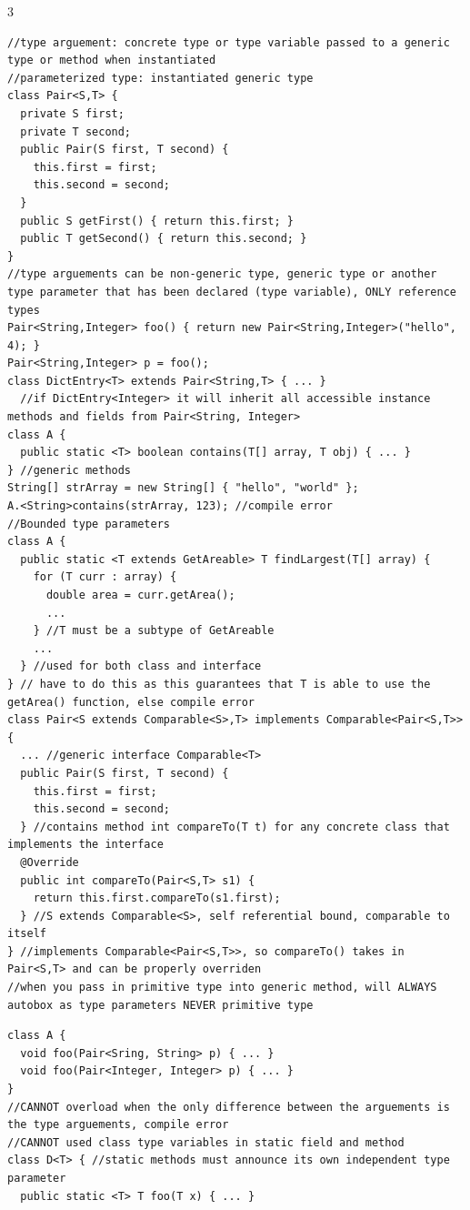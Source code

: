 \documentclass[10pt]{article}
\begin{document}
\begin{multicols*}{3}
\begin{verbatim}
//type arguement: concrete type or type variable passed to a generic type or method when instantiated
//parameterized type: instantiated generic type
class Pair<S,T> {
  private S first;
  private T second;
  public Pair(S first, T second) {
    this.first = first;
    this.second = second;
  }
  public S getFirst() { return this.first; }
  public T getSecond() { return this.second; }
}
//type arguements can be non-generic type, generic type or another type parameter that has been declared (type variable), ONLY reference types
Pair<String,Integer> foo() { return new Pair<String,Integer>("hello", 4); }
Pair<String,Integer> p = foo();
class DictEntry<T> extends Pair<String,T> { ... }
  //if DictEntry<Integer> it will inherit all accessible instance methods and fields from Pair<String, Integer>
class A {
  public static <T> boolean contains(T[] array, T obj) { ... }
} //generic methods
String[] strArray = new String[] { "hello", "world" };
A.<String>contains(strArray, 123); //compile error
//Bounded type parameters
class A {
  public static <T extends GetAreable> T findLargest(T[] array) {
    for (T curr : array) {
      double area = curr.getArea();
      ...
    } //T must be a subtype of GetAreable
    ...
  } //used for both class and interface
} // have to do this as this guarantees that T is able to use the getArea() function, else compile error
class Pair<S extends Comparable<S>,T> implements Comparable<Pair<S,T>> {
  ... //generic interface Comparable<T>
  public Pair(S first, T second) {
    this.first = first;
    this.second = second;
  } //contains method int compareTo(T t) for any concrete class that implements the interface 
  @Override
  public int compareTo(Pair<S,T> s1) {
    return this.first.compareTo(s1.first);
  } //S extends Comparable<S>, self referential bound, comparable to itself
} //implements Comparable<Pair<S,T>>, so compareTo() takes in Pair<S,T> and can be properly overriden
//when you pass in primitive type into generic method, will ALWAYS autobox as type parameters NEVER primitive type
\end{verbatim}
\begin{verbatim}
class A {
  void foo(Pair<Sring, String> p) { ... }
  void foo(Pair<Integer, Integer> p) { ... }
}
//CANNOT overload when the only difference between the arguements is the type arguements, compile error
//CANNOT used class type variables in static field and method
class D<T> { //static methods must announce its own independent type parameter
  public static <T> T foo(T x) { ... }

\end{verbatim}
\end{multicols*}
\end{document}
